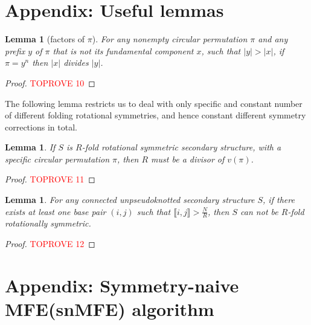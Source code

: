 \documentclass[11pt,letterpaper]{article}  \usepackage[margin=1in]{geometry}
\newtheorem{lemma}[theorem]{Lemma}
\theoremstyle{definition}  \newtheorem{Definition}[theorem]{Definition}
\newcommand{\snMFE}{snMFE\xspace}
\newcommand{\SymnMFE}{Symmetry-naive MFE\xspace}
\begin{document}
	   
	
	
	\newpage
	\appendix
	\section{Appendix: Useful lemmas}\label{sec:lemmasApp}
\begin{lemma}[factors of $\pi$]\label{lem:factors}
	For any nonempty circular permutation $\pi$ 
	and any prefix $y$ of $\pi$ that is not its fundamental component $x$, 
	such that $|y|>|x|$, 
	if $\pi = y^n$ then $|x|$ divides $|y|$.    
\end{lemma}
\begin{proof}\textcolor{red}{TOPROVE 10}\end{proof}


The following lemma restricts us to deal with only specific and constant number of different folding rotational symmetries, and hence constant different symmetry corrections in total. 
\begin{lemma}\label{lem:div}
	If $S$ is $R$-fold rotational symmetric secondary structure, with a specific circular permutation $\pi$, then $R$ must be a divisor of $v(\pi)$.
\end{lemma}

\begin{proof}\textcolor{red}{TOPROVE 11}\end{proof}



\begin{lemma} \label{lem:nobase}
	For any connected unpseudoknotted secondary structure $S$, if there exists at least one base pair $(i,j)$ such that $\llbracket i,j \rrbracket > \frac{N}{R}$, then $S$ can not be  $R$-fold rotationally symmetric. 
\end{lemma}
\begin{proof}\textcolor{red}{TOPROVE 12}\end{proof}



  \newpage
	


\section{Appendix: \SymnMFE  (\snMFE) algorithm}\label{sec:AlgoMFE}
\end{document}
